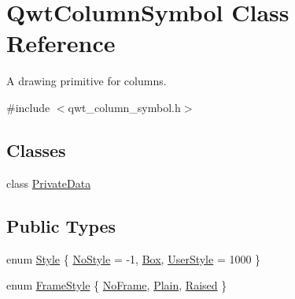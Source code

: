 \hypertarget{class_qwt_column_symbol}{\section{Qwt\-Column\-Symbol Class Reference}
\label{class_qwt_column_symbol}
}


A drawing primitive for columns.  




{\ttfamily \#include $<$qwt\-\_\-column\-\_\-symbol.\-h$>$}

\subsection*{Classes}
\begin{DoxyCompactItemize}
\item 
class \hyperlink{class_qwt_column_symbol_1_1_private_data}{Private\-Data}
\end{DoxyCompactItemize}
\subsection*{Public Types}
\begin{DoxyCompactItemize}
\item 
enum \hyperlink{class_qwt_column_symbol_aaace508375eef3ee23ed6c47b1d65ef2}{Style} \{ \hyperlink{class_qwt_column_symbol_aaace508375eef3ee23ed6c47b1d65ef2a3c16d900e0dcfc18f174f4120136cb5b}{No\-Style} = -\/1, 
\hyperlink{class_qwt_column_symbol_aaace508375eef3ee23ed6c47b1d65ef2ad21d1b393a2474a1caa6a9d83daa8f21}{Box}, 
\hyperlink{class_qwt_column_symbol_aaace508375eef3ee23ed6c47b1d65ef2aa9a5f984f62fb53ce3eeea35be3b0536}{User\-Style} = 1000
 \}
\item 
enum \hyperlink{class_qwt_column_symbol_a4b97f7748370447559a11a5adeb70e44}{Frame\-Style} \{ \hyperlink{class_qwt_column_symbol_a4b97f7748370447559a11a5adeb70e44a11a035d598228e1498b98153e3e9e043}{No\-Frame}, 
\hyperlink{class_qwt_column_symbol_a4b97f7748370447559a11a5adeb70e44a2841bca1e2a5d94fbfc5a51787460be1}{Plain}, 
\hyperlink{class_qwt_column_symbol_a4b97f7748370447559a11a5adeb70e44a078f2b7db1cee79e83878fcc869df62e}{Raised}
 \}
\end{DoxyCompactItemize}
